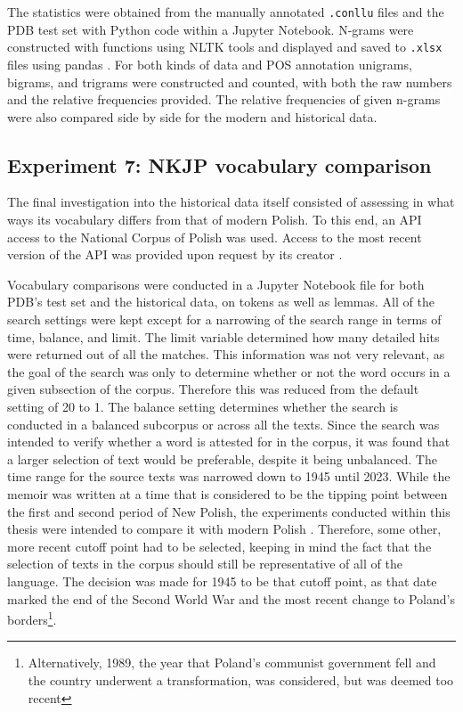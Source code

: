 The statistics were obtained from the manually annotated \texttt{.conllu} files and the PDB test set with Python code within a Jupyter Notebook. N-grams were constructed with functions using NLTK tools and displayed and saved to \texttt{.xlsx} files using pandas \citep{bird_loper_klein_2009, reback2020pandas, mckinney-proc-scipy-2010}. For both kinds of data and POS annotation unigrams, bigrams, and trigrams were constructed and counted, with both the raw numbers and the relative frequencies provided. The relative frequencies of given n-grams were also compared side by side for the modern and historical data.

\subsection{Experiment 7: NKJP vocabulary comparison}
\label{subsec:nkjp-vocab}

The final investigation into the historical data itself consisted of assessing in what ways its vocabulary differs from that of modern Polish. To this end, an API access to the National Corpus of Polish was used. Access to the most recent version of the API was provided upon request by its creator \citep{pęzik_2012}. 

Vocabulary comparisons were conducted in a Jupyter Notebook file for both PDB's test set and the historical data, on tokens as well as lemmas. All of the search settings were kept except for a narrowing of the search range in terms of time, balance, and limit. The limit variable determined how many detailed hits were returned out of all the matches. This information was not very relevant, as the goal of the search was only to determine whether or not the word occurs in a given subsection of the corpus. Therefore this was reduced from the default setting of 20 to 1. The balance setting determines whether the search is conducted in a balanced subcorpus or across all the texts. Since the search was intended to verify whether a word is attested for in the corpus, it was found that a larger selection of text would be preferable, despite it being unbalanced. The time range for the source texts was narrowed down to 1945 until 2023. While the memoir was written at a time that is considered to be the tipping point between the first and second period of New Polish, the experiments conducted within this thesis were intended to compare it with modern Polish \citep{długosz-kurczabowa_dubisz_2006}. Therefore, some other, more recent cutoff point had to be selected, keeping in mind the fact that the selection of texts in the corpus should still be representative of all of the language. The decision was made for 1945 to be that cutoff point, as that date marked the end of the Second World War and the most recent change to Poland's borders\footnote{Alternatively, 1989, the year that Poland's communist government fell and the country underwent a transformation, was considered, but was deemed too recent}.

